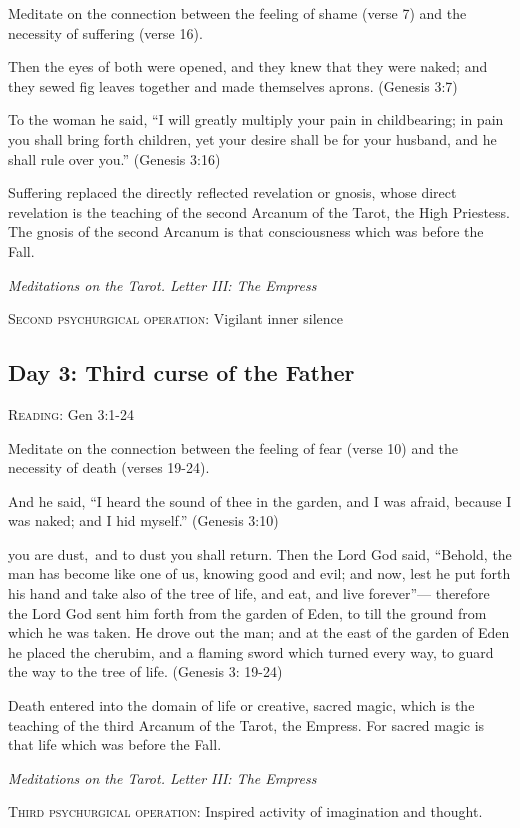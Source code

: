 Meditate on the connection between the feeling of shame (verse 7) and the necessity of suffering (verse 16).

Then the eyes of both were opened, and they knew that they were naked; and they sewed fig leaves together and made
themselves aprons. (Genesis 3:7)

To the woman he said, “I will greatly multiply your pain in childbearing; in pain you shall bring forth children, yet
your desire shall be for your husband, and he shall rule over you.” (Genesis 3:16)

\begin{quotationx}
Suffering replaced the directly reflected revelation or gnosis, whose direct revelation is the teaching of the second
Arcanum of the Tarot, the High Priestess. The gnosis of the second Arcanum is that consciousness which was before the
Fall. 
\begin{flushright}\textit{Meditations on the Tarot. Letter III: The Empress}\end{flushright} 

\end{quotationx}
\textsc{Second psychurgical operation}: Vigilant inner silence

\subsection*{Day 3: Third curse of the Father}
\textsc{Reading}: Gen 3:1-24

Meditate on the connection between the feeling of fear (verse 10) and the necessity of death (verses 19-24).

And he said, “I heard the sound of thee in the garden, and I was afraid, because I was naked; and I hid myself.”
(Genesis 3:10)

you are dust, and to dust you shall return. Then the Lord God said, “Behold, the man has become like one of us, knowing
good and evil; and now, lest he put forth his hand and take also of the tree of life, and eat, and live
forever”— therefore the Lord God sent him forth from the garden of Eden, to till the ground from
which he was taken. He drove out the man; and at the east of the garden of Eden he placed the cherubim, and a flaming
sword which turned every way, to guard the way to the tree of life. (Genesis 3: 19-24)

\begin{quotationx}
Death entered into the domain of life or creative, sacred magic, which is the teaching of the third Arcanum of the
Tarot, the Empress. For sacred magic is that life which was before the Fall. \begin{flushright}\textit{Meditations on the Tarot. Letter III: The Empress}\end{flushright} 

\end{quotationx}
\textsc{Third psychurgical operation}: Inspired activity of imagination and thought.


